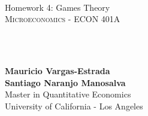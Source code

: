 {
	\parindent0pt
	\ \\ \ \\ \ \\

	\hrulefill
	\vspace{0.0cm}
	\begin{spacing}{2.1}
	{	
		\flushleft
		\fontsize{22pt}{44pt}\selectfont 
		Homework 4: Games Theory
	}\\
	\textsc{Microeconomics - ECON 401A}
	\end{spacing}

	\ \\ \ \\
	{
		\textbf{Mauricio Vargas-Estrada}\\
		\textbf{Santiago Naranjo Manosalva}\\
		Master in Quantitative Economics\\
		University of California - Los Angeles\par
	}
	\ \\

	\hrulefill

}
